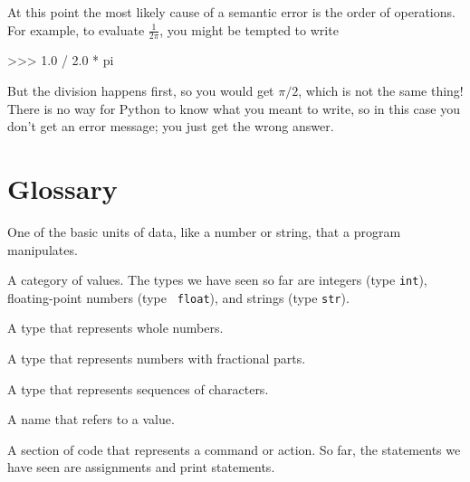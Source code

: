 
At this point the most likely cause of a semantic error is
the order of operations.  For example, to evaluate $\frac{1}{2 \pi}$,
you might be tempted to write

\beforeverb
\begin{pyinterpreter}
>>> 1.0 / 2.0 * pi
\end{pyinterpreter}
\afterverb
%
But the division happens first, so you would get $\pi / 2$, which
is not the same thing!  There is no way for Python
to know what you meant to write, so in this case you don't
get an error message; you just get the wrong answer.



\section{Glossary}

\begin{vocabulary}[value:]  One of the basic units of data, like a number or string, 
that a program manipulates.
\end{vocabulary}
	
\begin{vocabulary}[type:] A category of values.  The types we have seen so far
are integers (type {\tt int}), floating-point numbers (type {\tt
float}), and strings (type {\tt str}).
\end{vocabulary}
	
\begin{vocabulary}[integer:] A type that represents whole numbers.
\end{vocabulary}
	
\begin{vocabulary} A type that represents numbers with fractional
parts.
\end{vocabulary}
	
\begin{vocabulary}[string:] A type that represents sequences of characters.
\end{vocabulary}
	
\begin{vocabulary}[variable:]  A name that refers to a value.
\end{vocabulary}
	
\begin{vocabulary}[statement:]  A section of code that represents a command or action.  So
far, the statements we have seen are assignments and print statements.
\end{vocabulary}
	
